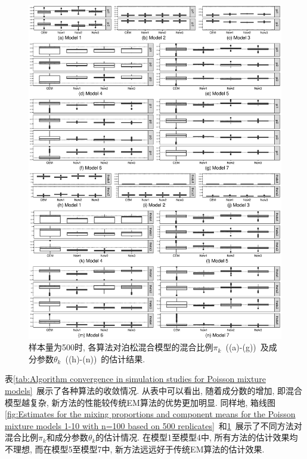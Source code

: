 \documentclass[a4paper,12pt,openany,oneside,utf-8]{ctexbook}
\begin{document}
\begin{figure}[htbp]
  \centering
  \includegraphics[width = 1\textwidth]{Figure_7_Estimates_for_the_mixing_proportions_and_component_means_for_the_Poisson_mixture_models_with_n_500.eps}
  \caption{样本量为500时, 各算法对泊松混合模型的混合比例$\pi_k$~((a)-(g))~及成分参数$\theta_k$~((h)-(n))~的估计结果.}
  \label{fig:Estimates for the mixing proportions and component means for the Poisson mixture models 1-10 with n=500 based on 500 replicates} %
\end{figure}

表\ref{tab:Algorithm convergence in simulation studies for Poisson mixture models}~展示了各种算法的收敛情况. 从表中可以看出, 随着成分数的增加, 即混合模型越复杂, 新方法的性能较传统EM算法的优势更加明显. 同样地, 箱线图\ref{fig:Estimates for the mixing proportions and component means for the Poisson mixture models 1-10 with n=100 based on 500 replicates}~和\ref{fig:Estimates for the mixing proportions and component means for the Poisson mixture models 1-10 with n=500 based on 500 replicates}~展示了不同方法对混合比例$\pi_k$和成分参数$\theta_k$的估计情况. 在模型1至模型4中, 所有方法的估计效果均不理想, 而在模型5至模型7中, 新方法远远好于传统EM算法的估计效果.
\end{document}
